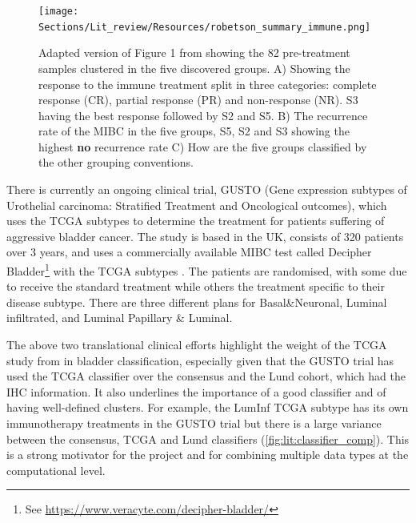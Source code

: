 \begin{figure}[!htb]    
    \centering
    \texttt{[image: Sections/Lit\_review/Resources/robetson\_summary\_immune.png]}
    \caption[MIBC subtypes based on the response to immunotherapy]{Adapted version of Figure 1 from \cite{Robertson2023-na} showing the 82 pre-treatment samples clustered in the five discovered groups. A) Showing the response to the immune treatment split in three categories: complete response (CR), partial response (PR) and non-response (NR). S3 having the best response followed by S2 and S5. B) The recurrence rate of the MIBC in the five groups, S5, S2 and S3 showing the highest \textbf{no} recurrence rate C) How are the five groups classified by the other grouping conventions.}
    \label{fig:lit:immune_rob}
\end{figure}


There is currently an ongoing clinical trial, GUSTO (Gene expression subtypes of Urothelial carcinoma: Stratified Treatment and Oncological outcomes), which uses the TCGA subtypes to determine the treatment for patients suffering of aggressive bladder cancer. The study is based in the UK, consists of 320 patients over 3 years, and uses a commercially available MIBC test called Decipher Bladder\footnote{See \url{https://www.veracyte.com/decipher-bladder/}} with the TCGA subtypes \cite{Griffin2024-zr}. The patients are randomised, with some  due to receive the standard treatment while others the treatment specific to their disease subtype. There are three different plans for Basal\&Neuronal, Luminal infiltrated, and Luminal Papillary \& Luminal.

The above two translational clinical efforts highlight the weight of the TCGA study from \citet{Robertson2017-mg} in bladder classification, especially given that the GUSTO trial has used the TCGA classifier over the consensus and the Lund cohort, which had the IHC information. It also underlines the importance of a good classifier and of having well-defined clusters. For example, the LumInf TCGA subtype has its own immunotherapy treatments in the GUSTO trial but there is a large variance between the consensus, TCGA and Lund classifiers (\cref{fig:lit:classifier_comp}). This is a strong motivator for the project and for combining multiple data types at the computational level.




